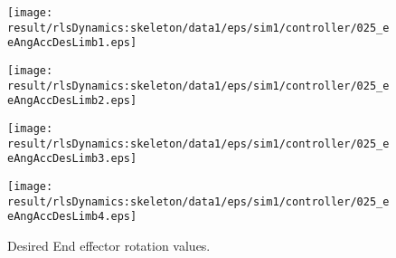 \begin{figure}[h]
\begin{minipage}{0.24\linewidth}
\centering
\texttt{[image: \\result/rlsDynamics:skeleton/data1/eps/sim1/controller/025\_eeAngAccDesLimb1.eps]}
\par\footnotesize{}
\end{minipage}
\begin{minipage}{0.24\linewidth}
\centering
\texttt{[image: \\result/rlsDynamics:skeleton/data1/eps/sim1/controller/025\_eeAngAccDesLimb2.eps]}
\par\footnotesize{}
\end{minipage}
\begin{minipage}{0.24\linewidth}
\centering
\texttt{[image: \\result/rlsDynamics:skeleton/data1/eps/sim1/controller/025\_eeAngAccDesLimb3.eps]}
\par\footnotesize{}
\end{minipage}
\begin{minipage}{0.24\linewidth}
\centering
\texttt{[image: \\result/rlsDynamics:skeleton/data1/eps/sim1/controller/025\_eeAngAccDesLimb4.eps]}
\par\footnotesize{}
\end{minipage}

\caption{Desired End effector rotation values.}
\end{figure}
